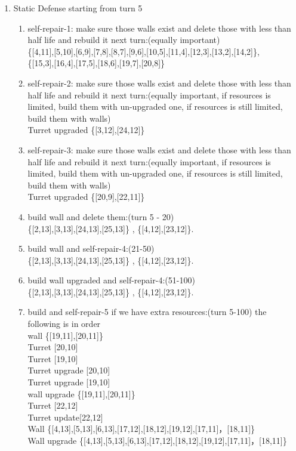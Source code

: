\documentclass[12pt]{article}
\begin{document}
\begin{enumerate}
     \item Static Defense starting from turn 5
\begin{enumerate}
\item self-repair-1: make sure those walls exist and delete those with less than half life and rebuild it next turn:(equally important)\\ \{[4,11],[5,10],[6,9],[7,8],[8,7],[9,6],[10,5],[11,4],[12,3],[13,2],[14,2]\},\\\{[15,3],[16,4],[17,5],[18,6],[19,7],[20,8]\}
\item self-repair-2: make sure those walls exist and delete those with less than half life and rebuild it next turn:(equally important, if resources is limited, build them with un-upgraded one, if resources is still limited, build them with walls)\\ Turret upgraded \{[3,12],[24,12]\}
\item self-repair-3: make sure those walls exist and delete those with less than half life and rebuild it next turn:(equally important, if resources is limited, build them with un-upgraded one, if resources is still limited, build them with walls)\\ Turret upgraded \{[20,9],[22,11]\}
\item build wall and delete them:(turn 5 - 20)\\ \{[2,13],[3,13],[24,13],[25,13]\} , \{[4,12],[23,12]\}.
\item build wall and self-repair-4:(21-50)\\ \{[2,13],[3,13],[24,13],[25,13]\} , \{[4,12],[23,12]\}.
\item build wall upgraded and self-repair-4:(51-100)\\ \{[2,13],[3,13],[24,13],[25,13]\} , \{[4,12],[23,12]\}.
\item build and self-repair-5 if we have extra resources:(turn 5-100) the following is in order\\ wall \{[19,11],[20,11]\}\\ Turret [20,10] \\ Turret [19,10] \\ Turret upgrade [20,10] \\ Turret upgrade [19,10] \\ wall upgrade \{[19,11],[20,11]\}\\ Turret [22,12]\\ Turret update[22,12]\\ Wall \{[4,13],[5,13],[6,13],[17,12],[18,12],[19,12],[17,11]，[18,11]\}\\ Wall upgrade \{[4,13],[5,13],[6,13],[17,12],[18,12],[19,12],[17,11]，[18,11]\}\

\end{enumerate}
\end{enumerate}
\end{document}
